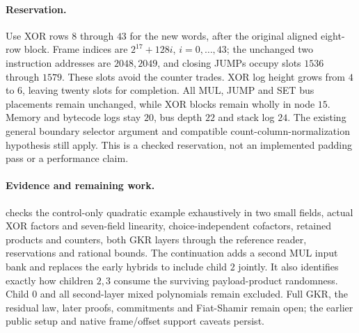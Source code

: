 \paragraph{Reservation.} Use XOR rows $8$ through $43$ for the new words, after the original aligned eight-row block. Frame indices are $2^{17}+128i$, $i=0,\ldots,43$; the unchanged two instruction addresses are $2048,2049$, and closing JUMPs occupy slots $1536$ through $1579$. These slots avoid the counter trades. XOR log height grows from $4$ to $6$, leaving twenty slots for completion. All MUL, JUMP and SET bus placements remain unchanged, while XOR blocks remain wholly in node $15$. Memory and bytecode logs stay $20$, bus depth $22$ and stack log $24$. The existing general boundary selector argument and compatible count-column-normalization hypothesis still apply. This is a checked reservation, not an implemented padding pass or a performance claim.

\paragraph{Evidence and remaining work.}  checks the control-only quadratic example exhaustively in two small fields, actual XOR factors and seven-field linearity, choice-independent cofactors, retained products and counters, both GKR layers through the reference reader, reservations and rational bounds. The continuation  adds a second MUL input bank and replaces the early hybrids to include child $2$ jointly. It also identifies exactly how children $2,3$ consume the surviving payload-product randomness. Child $0$ and all second-layer mixed polynomials remain excluded. Full GKR, the residual law, later proofs, commitments and Fiat-Shamir remain open; the earlier public setup and native frame/offset support caveats persist.
